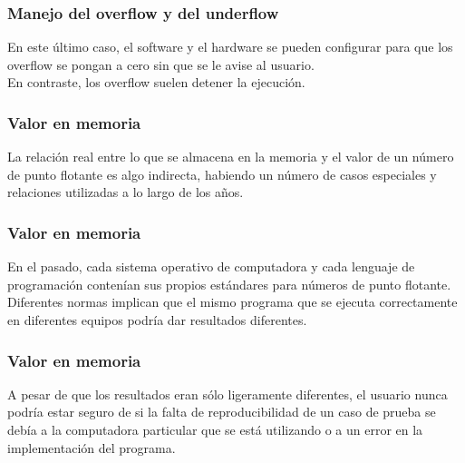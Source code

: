 \begin{frame}
\frametitle{Manejo del overflow y del underflow}
En este último caso, el software y el hardware se pueden configurar para que los overflow se pongan a cero sin que se le avise al usuario.
\\
\bigskip
En contraste, los overflow suelen detener la ejecución.
\end{frame}
\begin{frame}
\frametitle{Valor en memoria}
La relación real entre lo que se almacena en la memoria y el valor de un número de punto flotante es algo indirecta, habiendo un número de casos especiales y relaciones utilizadas a lo largo de los años.
\end{frame}
\begin{frame}
\frametitle{Valor en memoria}
En el pasado, cada sistema operativo de computadora y cada lenguaje de programación contenían sus propios estándares para números de punto flotante.
\\
\bigskip
Diferentes normas implican que el mismo programa que se ejecuta correctamente en diferentes equipos podría dar resultados diferentes.
\end{frame}
\begin{frame}
\frametitle{Valor en memoria}
A pesar de que los resultados eran sólo ligeramente diferentes, el usuario nunca podría estar seguro de si la falta de reproducibilidad de un caso de prueba se debía a la computadora particular que se está utilizando o a un error en la implementación del programa.
\end{frame}
